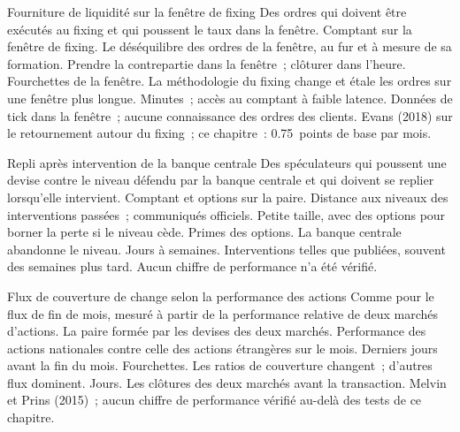 \begin{strategyfile}{Fourniture de liquidité sur la fenêtre de fixing}\label{strat:s2:fx-flow-strategies:fix}
 Des ordres qui doivent être exécutés au fixing et qui poussent le taux dans la fenêtre.
 Comptant sur la fenêtre de fixing.
 Le déséquilibre des ordres de la fenêtre, au fur et à mesure de sa formation.
 Prendre la contrepartie dans la fenêtre~; clôturer dans l'heure.
 Fourchettes de la fenêtre.
 La méthodologie du fixing change et étale les ordres sur une fenêtre plus longue.
 Minutes~; accès au comptant à faible latence.
 Données de tick dans la fenêtre~; aucune connaissance des ordres des clients.
 Evans (2018) sur le retournement autour du fixing~; ce chapitre~: 0.75~points de base par mois.
\end{strategyfile}

\begin{strategyfile}{Repli après intervention de la banque centrale}\label{strat:s2:fx-flow-strategies:cb}
 Des spéculateurs qui poussent une devise contre le niveau défendu par la banque centrale et qui doivent se replier lorsqu'elle intervient.
 Comptant et options sur la paire.
 Distance aux niveaux des interventions passées~; communiqués officiels.
 Petite taille, avec des options pour borner la perte si le niveau cède.
 Primes des options.
 La banque centrale abandonne le niveau.
 Jours à semaines.
 Interventions telles que publiées, souvent des semaines plus tard.
 Aucun chiffre de performance n'a été vérifié.
\end{strategyfile}

\begin{strategyfile}{Flux de couverture de change selon la performance des actions}\label{strat:s2:fx-flow-strategies:equityhedge}
 Comme pour le flux de fin de mois, mesuré à partir de la performance relative de deux marchés d'actions.
 La paire formée par les devises des deux marchés.
 Performance des actions nationales contre celle des actions étrangères sur le mois.
 Derniers jours avant la fin du mois.
 Fourchettes.
 Les ratios de couverture changent~; d'autres flux dominent.
 Jours.
 Les clôtures des deux marchés avant la transaction.
 Melvin et Prins (2015)~; aucun chiffre de performance vérifié au-delà des tests de ce chapitre.
\end{strategyfile}

